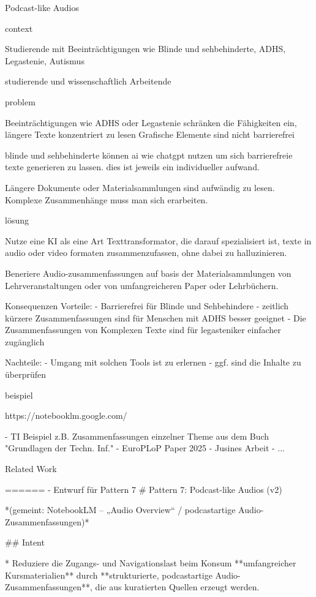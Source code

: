 Podcast-like Audios​

context

Studierende mit Beeinträchtigungen wie Blinde und sehbehinderte, ADHS, Legastenie, Autismus

studierende und wissenschaftlich Arbeitende

problem 

Beeinträchtigungen wie ADHS oder Legastenie schränken die Fähigkeiten ein, längere Texte konzentriert zu lesen  
Grafische Elemente sind  nicht barrierefrei

blinde und sehbehinderte können ai wie chatgpt nutzen um sich barrierefreie texte generieren zu lassen. dies ist jeweils ein individueller aufwand. 

Längere  Dokumente oder Materialsammlungen sind aufwändig zu lesen. Komplexe Zusammenhänge muss man sich erarbeiten.

lösung

Nutze eine KI als eine Art Texttransformator, die darauf spezialisiert ist, texte in audio oder video formaten zusammenzufassen, ohne dabei zu halluzinieren.

Beneriere Audio-zusammenfassungen auf basis  der Materialsammlungen von Lehrveranstaltungen oder von umfangreicheren  Paper oder Lehrbüchern.

Konsequenzen
Vorteile:
    - Barrierefrei für Blinde und Sehbehindere
    - zeitlich kürzere Zusammenfassungen sind für Menschen mit ADHS besser geeignet
    - Die Zusammenfassungen von Komplexen Texte sind für legasteniker einfacher zugänglich 

Nachteile:
    - Umgang mit solchen Tools ist zu erlernen
    - ggf. sind die Inhalte zu überprüfen

beispiel

https://notebooklm.google.com/

- TI Beispiel z.B. Zusammenfassungen einzelner Theme aus dem Buch "Grundlagen der Techn. Inf." 
- EuroPLoP Paper 2025
- Jusines Arbeit
- ...

Related Work


====== - Entwurf für Pattern 7
# Pattern 7: Podcast-like Audios (v2)

*(gemeint: NotebookLM – „Audio Overview“ / podcastartige Audio-Zusammenfassungen)*

## Intent

* Reduziere die Zugangs- und Navigationslast beim Konsum **umfangreicher Kursmaterialien** durch **strukturierte, podcastartige Audio-Zusammenfassungen**, die aus kuratierten Quellen erzeugt werden.

